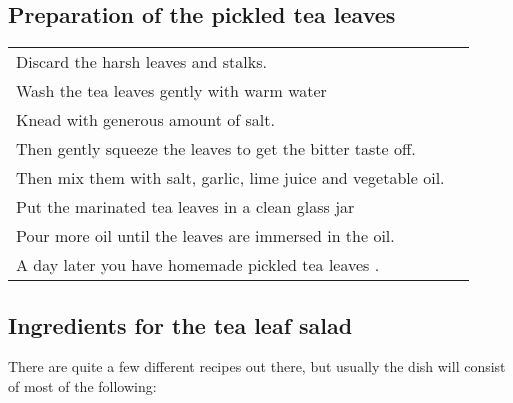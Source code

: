\documentclass[conference]{IEEEtran}
\begin{document}
\subsection{Preparation of the pickled tea leaves}
\label{subsec:LPPreparation}
{
\begin{tabular}{l c }
Discard the harsh leaves and stalks. \\
Wash the tea leaves gently with warm water \\
Knead with generous amount of salt. \\
Then gently squeeze the leaves to get the bitter taste off. \\
Then mix them with salt, garlic, lime juice and vegetable oil. \\
Put the marinated tea leaves in a clean glass jar \\
Pour more oil until the leaves are immersed in the oil. \\
A day later you have homemade pickled tea leaves \cite{b8}.  \\
\end{tabular}
}

\subsection{Ingredients for the tea leaf salad}
\label{subsec:LPTIngredient}
There are quite a few different recipes out there, but usually the dish will consist of most of the following:
\end{document}
